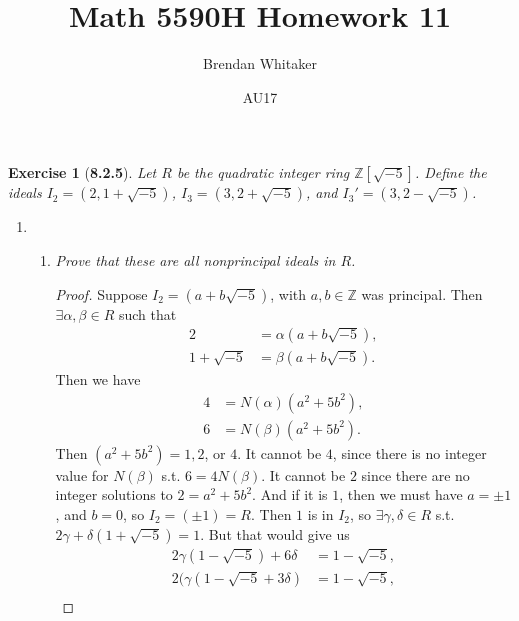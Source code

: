\documentclass[10pt,oneside,reqno]{amsart}
\theoremstyle{plain}
\newtheorem*{e}{Exercise}
\theoremstyle{definition}
\begin{document}
\title{Math 5590H Homework 11}

\date{AU17}

\author[Brendan Whitaker]{Brendan Whitaker}

\maketitle

\begin{e}[\textbf{8.2.5}]
Let $R$ be the quadratic integer ring $\mathbb{Z}[\sqrt{-5}]$. Define the ideals $I_2 = (2,1 + \sqrt{-5})$, $I_3 = (3,2 + \sqrt{-5})$, and $I_3' = (3,2 - \sqrt{-5})$. 
\end{e}
\begin{enumerate}
\item[]
\begin{enumerate}
\item \textit{Prove that these are all nonprincipal ideals in $R$. }
\begin{proof}
Suppose $I_2 = (a + b\sqrt{-5})$, with $a,b \in \mathbb{Z}$ was principal. Then $\exists \alpha,\beta \in R$ such that 
\begin{equation}
\begin{aligned}
2 &= \alpha(a + b\sqrt{-5}),\\
1 + \sqrt{-5} &= \beta(a + b\sqrt{-5}).
\end{aligned}
\end{equation}
 Then we have
 \begin{equation}
\begin{aligned}
4 &= N(\alpha)(a^2 + 5b^2),\\
6 &= N(\beta)(a^2 + 5b^2).
\end{aligned}
\end{equation}
Then $(a^2 + 5b^2) = 1,2$, or $4$. It cannot be $4$, since there is no integer value for $N(\beta)$ s.t. $6 = 4N(\beta)$. It cannot be $2$ since there are no integer solutions to $2 = a^2 + 5b^2$. And if it is $1$, then we must have $a = \pm 1$, and $b =0$, so $I_2 = (\pm 1) = R$. Then $1$ is in $I_2$, so $\exists \gamma,\delta \in R$ s.t. $2\gamma + \delta(1 + \sqrt{-5}) = 1$. But that would give us
\begin{equation}
\begin{aligned}
2\gamma (1- \sqrt{-5}) + 6\delta &= 1 - \sqrt{-5},\\
2(\gamma (1- \sqrt{-5} + 3\delta) &= 1 - \sqrt{-5},\\
\end{aligned}
\end{equation}

\end{proof}
\end{enumerate}
\end{enumerate}
\end{document}
